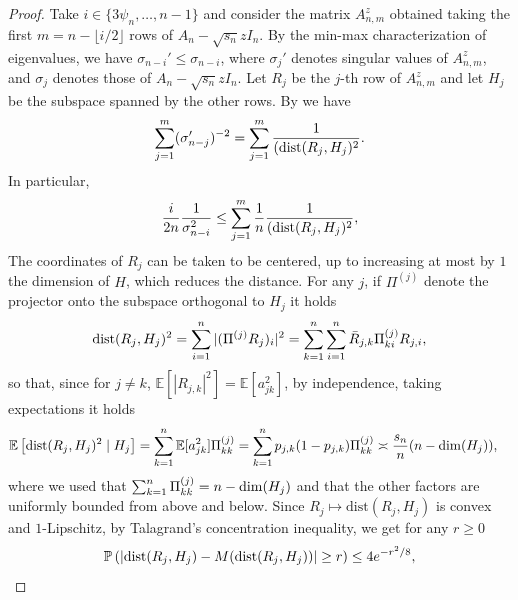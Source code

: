 \documentclass[11pt,oneside]{amsart}
\theoremstyle{plain}
\numberwithin{equation}{section}
\newcommand{\E}{\mathbb{E}}
\newcommand{\p}{\mathbb{P}}
\newcommand{\scaling}{s_n}
\begin{document}
\begin{proof}
Take $i \in \{3\psi_n ,\dots,n-1\}$ and
    consider the matrix ${A}_{n,m}^z$ obtained taking the first $m=n-\lfloor i/2\rfloor$ rows of ${A}_n-\sqrt{\scaling}zI_n$. By the min-max characterization of eigenvalues, we have $\sigma_{n-i}' \le \sigma_{n-i}$, where $\sigma_j'$ denotes singular values of ${A}_{n,m}^z$, and $\sigma_j$ denotes those of $A_n-\sqrt{s_n} zI_n$. Let $R_j$ be the $j$-th row of ${A}_{n,m}^z$ and let $H_j$ be the subspace spanned by the other rows. By \cite[Lemmata A.1 and A.4]{TVK} we have
    \begin{equation}
        \sum_{j = 1}^{m} (\sigma_{n-j}')^{-2} =  \sum_{j = 1}^{m}  \frac{1}{({\rm dist} (R_j,H_j)^2}.
    \end{equation}
    In particular, 
    \begin{equation} \label{eq:sing}
        \frac{i}{2n}\frac{1}{\sigma_{n-i}^{2}} \le \sum_{j = 1}^{m}  \frac{1}{n}\frac{1}{({\rm dist} (R_j,H_j)^2},
    \end{equation}
    The coordinates of $R_j$ can be taken to be centered, up to increasing at most by $1$ the dimension of $H$, which reduces the distance.
    For any $j$, if $\Pi^{(j)}$ denote the projector onto the subspace orthogonal to $H_j$ it holds
    \begin{equation}
        {\rm dist}(R_j,H_j)^2=\sum_{i=1}^{n} |(\Pi^{(j)}R_j)_i|^2 = \sum_{k=1}^n\sum_{i=1}^n \bar R_{j,k}\Pi^{(j)}_{ki}R_{j,i}, 
    \end{equation}
   so that, since for $j \neq k$, $\E[|R_{j,k}|^2]=\E[a_{jk}^2]$, by independence, taking expectations it holds
    \begin{equation}
    \begin{split}
        \E\left[{\rm dist}(R_j,H_j)^2\mid H_j\right]
        &=\sum_{k=1}^n \E[ a_{jk}^2]\Pi^{(j)}_{kk}=
        \sum_{k=1}^n p_{j,k}(1-p_{j,k}) \Pi^{(j)}_{kk}\asymp\frac{\scaling}{n} (n-{\rm dim}(H_j)),
        \end{split}
    \end{equation}
    where we used that $ \sum_{k=1}^n  \Pi^{(j)}_{kk} = n-{\rm dim}(H_j)$ and that the other factors are uniformly bounded from above and below. 
   Since $R_j\mapsto \mathrm{dist} (R_j, H_j)$ is convex and $1$-Lipschitz, by Talagrand's concentration inequality, we get for any $r\ge 0$
    \begin{equation}
        \p\left(|{\rm dist}(R_j,H_j)-M({\rm dist}(R_j,H_j))| \ge r\right) \le 4e^{-r^2/8},

\end{equation}
\end{proof}
\end{document}
